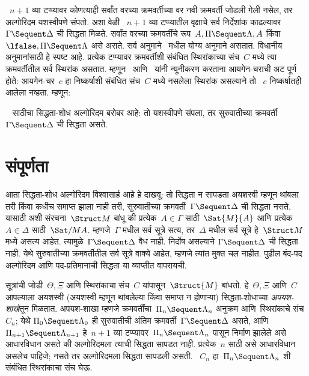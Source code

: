 ~$n+1$ व्या टप्प्यावर कोणत्याही सर्वांत वरच्या
क्रमवर्तीच्या वर नवी क्रमवर्ती जोडली गेली नसेल,
तर अल्गोरिदम यशस्वीपणे संपतो. अशा वेळी
~$n+1$ व्या टप्प्यातील वृक्षाचे सर्व निर्देशांक
काढल्यावर~$\Gamma \Sequent \Delta$ ची
सिद्धता मिळते. सर्वांत वरच्या क्रमवर्तींचे
रूप~$A, \Pi \Sequent \Lambda, A$ किंवा
$\lfalse, \Pi \Sequent \Lambda$ असे असते.
सर्व अनुमाने~ मधील योग्य अनुमाने असतात.
विधानीय अनुमानांसाठी हे स्पष्ट आहे. प्रत्येक
टप्प्यावर क्रमवर्तीशी संबंधित स्थिरांकाच्या
संच~$C$ मध्ये त्या क्रमवर्तीतील सर्व स्थिरांक असतात.
म्हणून~\LeftR{\lexists} आणि~\RightR{\lforall}
यांनी न्यूनीकरण करताना आयगेन-चराची अट पूर्ण होते:
आयगेन-चर~$c$ हा निष्कर्षाशी संबंधित संच~$C$
मध्ये नसलेला स्थिरांक असल्याने तो
~$c$ निष्कर्षातही आलेला नव्हता. म्हणून:

\begin{prop}
~ साठीचा सिद्धता-शोध अल्गोरिदम बरोबर आहे:
तो यशस्वीपणे संपला, तर सुरुवातीच्या
क्रमवर्ती~$\Gamma \Sequent \Delta$ ची
सिद्धता असते.
\end{prop}













\section{संपूर्णता}\label{pt:ps:cpl:sec}

आता सिद्धता-शोध अल्गोरिदम विश्वासार्ह आहे हे दाखवू:
तो सिद्धता न सापडता अयशस्वी म्हणून थांबला तरी किंवा कधीच समाप्त झाला नाही तरी,
सुरुवातीच्या क्रमवर्ती~$\Gamma \Sequent \Delta$ ची
सिद्धता नसते. यासाठी अशी संरचना~$\Struct M$
बांधू की प्रत्येक~$A \in \Gamma$ साठी~$\Sat{M}{A}$
आणि प्रत्येक~$A \in \Delta$ साठी~$\Sat/{M}{A}$.
म्हणजे~$\Gamma$ मधील सर्व सूत्रे सत्य,
तर~$\Delta$ मधील सर्व सूत्रे हे~$\Struct M$
मध्ये असत्य आहेत. त्यामुळे~$\Gamma \Sequent \Delta$
वैध नाही.  निर्दोष असल्याने
$\Gamma \Sequent \Delta$ ची सिद्धता नाही.
येथे सुरुवातीच्या क्रमवर्तीतील सर्व सूत्रे वाक्ये आहेत,
म्हणजे त्यांत मुक्त चल नाहीत. पुढील बंद-पद अल्गोरिदम
आणि पद-प्रतिमानाची सिद्धता या व्याप्तीत वापरायची.

सूत्रांची जोडी~$\Theta, \Xi$ आणि
स्थिरांकाचा संच~$C$ यांपासून~$\Struct{M}$ बांधतो.
हे~$\Theta, \Xi$ आणि~$C$ आपल्याला अयशस्वी
(अयशस्वी म्हणून थांबलेल्या किंवा समाप्त न होणाऱ्या) सिद्धता-शोधाच्या
\emph{अपयश-शाखे}तून मिळतात. अपयश-शाखा म्हणजे
क्रमवर्तींचा~$\Pi_n \Sequent \Lambda_n$ अनुक्रम
आणि~स्थिरांकाचे संच~$C_n$; येथे
$\Pi_0 \Sequent \Lambda_0$ ही सुरुवातीची
अंतिम क्रमवर्ती~$\Gamma \Sequent \Delta$ असते,
आणि~$\Pi_{n+1} \Sequent \Lambda_{n+1}$
हे~$n+1$ व्या टप्प्यावर~$\Pi_n \Sequent \Lambda_n$
पासून निर्माण झालेले असे आधारविधान असते की
अल्गोरिदमला त्याची सिद्धता सापडत नाही.
प्रत्येक~$n$ साठी असे आधारविधान असलेच पाहिजे;
नसते तर अल्गोरिदमला सिद्धता सापडली असती.
~$C_n$ हा~$\Pi_n \Sequent \Lambda_n$
शी संबंधित स्थिरांकाचा संच घेऊ.

